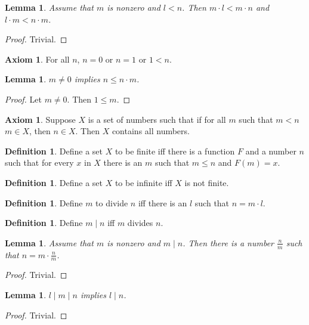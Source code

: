 \documentclass[a4paper,10pt]{article}
\theoremstyle{plain}
\newtheorem{lemma}[theorem]{Lemma}
\theoremstyle{definition}
\newtheorem{definition}[theorem]{Definition}
\newtheorem{axiom}[theorem]{Axiom}
\begin{document}
\begin{lemma} 
Assume that $m$ is nonzero and $l < n$.
Then $m \cdot l < m \cdot n$ and $l \cdot m < n \cdot m$.
\end{lemma}
\begin{proof}
Trivial.
\end{proof}

\begin{axiom} 
For all $n$, $n = 0$ or $n = 1$ or $1 < n$.
\end{axiom}

\begin{lemma}
$m \neq 0$ implies $n \leq n \cdot m$.
\end{lemma}
\begin{proof}
Let $m \neq 0$. Then $1 \leq m$.
\end{proof}

\begin{axiom}
Suppose $X$ is a set of numbers such that if for all $m$ such that $m < n$ $m \in X$, then $n \in X$. Then $X$ contains all numbers.
\end{axiom}

\begin{definition}
Define a set $X$ to be finite iff there is a function $F$ and a number $n$ such that for every $x$ in $X$ there is an $m$ such that $m \leq n$ and $F(m) = x$. 
\end{definition}

\begin{definition}
Define a set $X$ to be infinite iff $X$ is not finite.
\end{definition}

\begin{definition} 
Define $m$ to divide $n$ iff there is an $l$ such that $n = m \cdot l$.
\end{definition}

\begin{definition}
Define $m \mid n$ iff $m$ divides $n$.
\end{definition}

\begin{lemma}
Assume that $m$ is nonzero and $m \mid n$. Then there is a number $\frac{n}{m}$ such that $n = m \cdot \frac{n}{m}$.
\end{lemma}
\begin{proof}
Trivial.
\end{proof}

\begin{lemma} 
$l \mid m \mid n$ implies $l \mid n$.
\end{lemma}
\begin{proof}
Trivial.
\end{proof}
\end{document}
